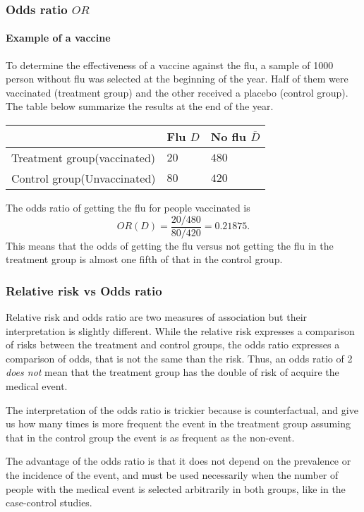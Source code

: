 \begin{frame}
\frametitle{Odds ratio $OR$}
\framesubtitle{Example of a vaccine}
To determine the effectiveness of a vaccine against the flu, a sample of 1000 person without flu was selected at the beginning of the year.
Half of them were vaccinated (treatment group) and the other received a placebo (control group).
The table below summarize the results at the end of the year. 

\begin{center}
  \begin{tabular}{|m{2.7cm}|m{1.5cm}<{\centering}|m{1.5cm}<{\centering}|}
  \cline{2-3}
  \multicolumn{1}{c|}{} & Flu $D$ & No flu $\overline D$\\ 
  \hline
  Treatment group\newline (vaccinated) & $20$ & $480$\\ 
  \hline 
  Control group\newline (Unvaccinated) & $80$ & $420$\\ 
  \hline
\end{tabular}
\end{center}

The odds ratio of getting the flu for people vaccinated is
\[
  OR(D) = \frac{20/480}{80/420} = 0.21875.
\]
This means that the odds of getting the flu versus not getting the flu in the treatment group is almost one fifth of that in the control group.
\end{frame}


\begin{frame}
\frametitle{Relative risk vs Odds ratio} 
Relative risk and odds ratio are two measures of association but their interpretation is slightly different.
While the relative risk expresses a comparison of risks between the treatment and control groups, the odds ratio expresses a comparison of odds, that is not the same than the risk.
Thus, an odds ratio of 2 \emph{does not} mean that the treatment group has the double of risk of acquire the medical event. 

The interpretation of the odds ratio is trickier because is counterfactual, and give us how many times is more frequent the event in the treatment group assuming that in the control group the event is as frequent as the non-event.

The advantage of the odds ratio is that it does not depend on the prevalence or the incidence of the event, and must be used necessarily when the number of people with the medical event is selected arbitrarily in both groups, like in the case-control studies.
\end{frame}


